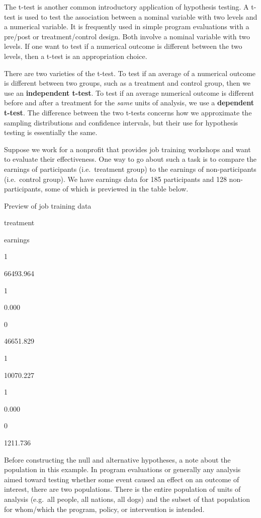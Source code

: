 \documentclass[
]{book}
\begin{document}
The t-test is another common introductory application of hypothesis testing. A t-test is used to test the association between a nominal variable with two levels and a numerical variable. It is frequently used in simple program evaluations with a pre/post or treatment/control design. Both involve a nominal variable with two levels. If one want to test if a numerical outcome is different between the two levels, then a t-test is an appropriation choice.

There are two varieties of the t-test. To test if an average of a numerical outcome is different between two groups, such as a treatment and control group, then we use an \textbf{independent t-test}. To test if an average numerical outcome is different before and after a treatment for the \emph{same} units of analysis, we use a \textbf{dependent t-test}. The difference between the two t-tests concerns how we approximate the sampling distributions and confidence intervals, but their use for hypothesis testing is essentially the same.

Suppose we work for a nonprofit that provides job training workshops and want to evaluate their effectiveness. One way to go about such a task is to compare the earnings of participants (i.e.~treatment group) to the earnings of non-participants (i.e.~control group). We have earnings data for 185 participants and 128 non-participants, some of which is previewed in the table below.

\label{tab:jobtraindata}Preview of job training data

treatment

earnings

1

66493.964

1

0.000

0

46651.829

1

10070.227

1

0.000

0

1211.736

Before constructing the null and alternative hypotheses, a note about the population in this example. In program evaluations or generally any analysis aimed toward testing whether some event caused an effect on an outcome of interest, there are two populations. There is the entire population of units of analysis (e.g.~all people, all nations, all dogs) and the subset of that population for whom/which the program, policy, or intervention is intended.
\end{document}
